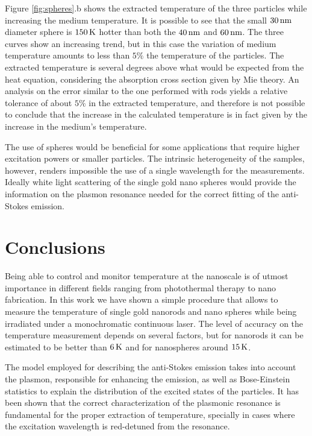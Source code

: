 Figure \ref{fig:spheres}.b shows the extracted temperature of the three
particles while increasing the medium temperature. It is possible to see that
the small $30\,\textrm{nm}$ diameter sphere is $150\,\textrm{K}$ hotter than both the $40\,\textrm{nm}$ and
$60\,\textrm{nm}$. The three curves show an increasing trend, but in this case the
variation of medium temperature amounts to less than $5\%$ the temperature of
the particles. The extracted temperature is several degrees above what would be
expected from the heat equation, considering the absorption cross section given
by Mie theory. An analysis on the error similar to the one performed with rods
yields a relative tolerance of about $5\%$ in the extracted temperature, and
therefore is not possible to conclude that the increase in the calculated
temperature is in fact given by the increase in the medium's temperature.

The use of spheres would be beneficial for some applications that require higher
excitation powers or smaller particles. The intrinsic heterogeneity of the
samples, however, renders impossible the use of a single wavelength for the
measurements. Ideally white light scattering of the single gold nano spheres
would provide the information on the plasmon resonance needed for the
correct fitting of the anti-Stokes emission.

\section{Conclusions}
Being able to control and monitor temperature at the nanoscale is of utmost
importance in different fields ranging from photothermal therapy\cite{Huang2006}
to nano fabrication\cite{Fedoruk2013}. In this work we have shown a simple
procedure that allows to measure the temperature of single gold nanorods and
nano spheres while being irradiated under a monochromatic continuous laser. The
level of accuracy on the temperature measurement depends on several factors, but
for nanorods it can be estimated to be better than $6\,\textrm{K}$ and for nanospheres
around $15\,\textrm{K}$.

The model employed for describing the anti-Stokes emission takes into account
the plasmon, responsible for enhancing the emission, as well as Bose-Einstein
statistics to explain the distribution of the excited states of the particles.
It has been shown that the correct characterization of the plasmonic resonance is
fundamental for the proper extraction of temperature, specially in cases
where the excitation wavelength is red-detuned from the resonance.

